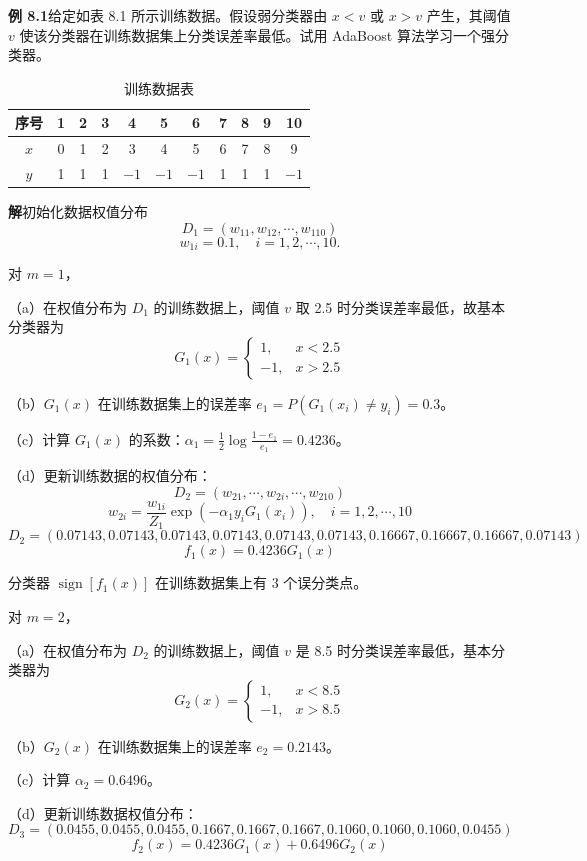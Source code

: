 \documentclass[UTF8,12pt,a4paper,fontset=fandol]{ctexart}
\begin{document}
\noindent\textbf{例 8.1}\quad 给定如表 8.1 所示训练数据。假设弱分类器由 $x<v$ 或 $x>v$ 产生，其阈值 $v$ 使该分类器在训练数据集上分类误差率最低。试用 AdaBoost 算法学习一个强分类器。

\begin{table}[htbp]
\centering
\caption{训练数据表}
\begin{tabular}{c*{10}{c}}
\toprule
序号 & 1 & 2 & 3 & 4 & 5 & 6 & 7 & 8 & 9 & 10\\
\midrule
$x$ & 0 & 1 & 2 & 3 & 4 & 5 & 6 & 7 & 8 & 9\\
$y$ & 1 & 1 & 1 & $-1$ & $-1$ & $-1$ & 1 & 1 & 1 & $-1$\\
\bottomrule
\end{tabular}
\end{table}

\noindent\textbf{解}\quad 初始化数据权值分布
\[
D_1=(w_{11},w_{12},\cdots,w_{110})
\]
\[
w_{1i}=0.1,\quad i=1,2,\cdots,10.
\]

对 $m=1$，

（a）在权值分布为 $D_1$ 的训练数据上，阈值 $v$ 取 2.5 时分类误差率最低，故基本分类器为
\[
G_1(x)=
\begin{cases}
1, & x<2.5\\
-1, & x>2.5
\end{cases}
\]

（b）$G_1(x)$ 在训练数据集上的误差率 $e_1=P(G_1(x_i)\ne y_i)=0.3$。

（c）计算 $G_1(x)$ 的系数：$\alpha_1=\frac{1}{2}\log\frac{1-e_1}{e_1}=0.4236$。

（d）更新训练数据的权值分布：
\[
D_2=(w_{21},\cdots,w_{2i},\cdots,w_{210})
\]
\[
w_{2i}=\frac{w_{1i}}{Z_1}\exp(-\alpha_1y_iG_1(x_i)),\quad i=1,2,\cdots,10
\]
\[
D_2=(0.07143,0.07143,0.07143,0.07143,0.07143,0.07143,
0.16667,0.16667,0.16667,0.07143)
\]
\[
f_1(x)=0.4236G_1(x)
\]

分类器 $\operatorname{sign}[f_1(x)]$ 在训练数据集上有 3 个误分类点。

对 $m=2$，

（a）在权值分布为 $D_2$ 的训练数据上，阈值 $v$ 是 8.5 时分类误差率最低，基本分类器为
\[
G_2(x)=
\begin{cases}
1, & x<8.5\\
-1, & x>8.5
\end{cases}
\]

（b）$G_2(x)$ 在训练数据集上的误差率 $e_2=0.2143$。

（c）计算 $\alpha_2=0.6496$。

（d）更新训练数据权值分布：
\[
D_3=(0.0455,0.0455,0.0455,0.1667,0.1667,0.1667,
0.1060,0.1060,0.1060,0.0455)
\]
\[
f_2(x)=0.4236G_1(x)+0.6496G_2(x)
\]
\end{document}
